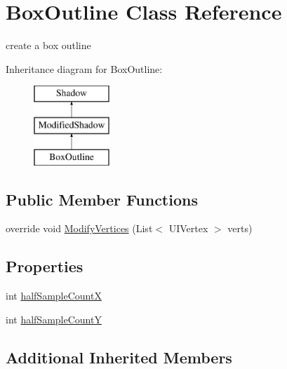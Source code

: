 \hypertarget{class_box_outline}{}\section{Box\+Outline Class Reference}
\label{class_box_outline}


create a box outline  


Inheritance diagram for Box\+Outline\+:\begin{figure}[H]
\begin{center}
\leavevmode
\includegraphics[height=3.000000cm]{class_box_outline}
\end{center}
\end{figure}
\subsection*{Public Member Functions}
\begin{DoxyCompactItemize}
\item 
override void \mbox{\hyperlink{class_box_outline_a2f73aa9d45a23d039aeff7a33a322019}{Modify\+Vertices}} (List$<$ U\+I\+Vertex $>$ verts)
\end{DoxyCompactItemize}
\subsection*{Properties}
\begin{DoxyCompactItemize}
\item 
int \mbox{\hyperlink{class_box_outline_a7a2b303e8572fffaf5384730964de22c}{half\+Sample\+CountX}}
\item 
int \mbox{\hyperlink{class_box_outline_a9c6dcbe45e4be7b977a063ffdcdc851e}{half\+Sample\+CountY}}
\end{DoxyCompactItemize}
\subsection*{Additional Inherited Members}


